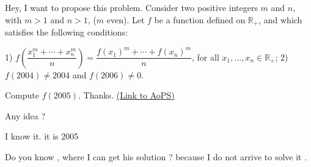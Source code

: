 \begin{problem}
	Hey, I want to propose this problem. Consider two positive integers $m$ and $n$, with  $m > 1$ and $n>1$, ($m$ even).  Let $f$ be a function defined on $\mathbb{R}_+$, and which satisfies the following   conditions:

1) $f\left (\dfrac {x_1^m +\cdots+x_n^m} {n} \right) = \dfrac {f(x_1)^m +\cdots+f(x_n)^m} {n}$, for all $x_1, \ldots,x_n \in \mathbb{R}_+$; 
2) $f(2004)\neq  2004$ and $f(2006) \neq 0$. 

Compute  $f(2005)$. Thanks.
	\flushright \href{https://artofproblemsolving.com/community/c6h462127}{(Link to AoPS)}
\end{problem}



\begin{solution}
	Any idea ?
\end{solution}



\begin{solution}
	I know it. it is 2005
\end{solution}



\begin{solution}
	Do you know , where I can get his solution ? because I do not arrive to solve it .
\end{solution}



